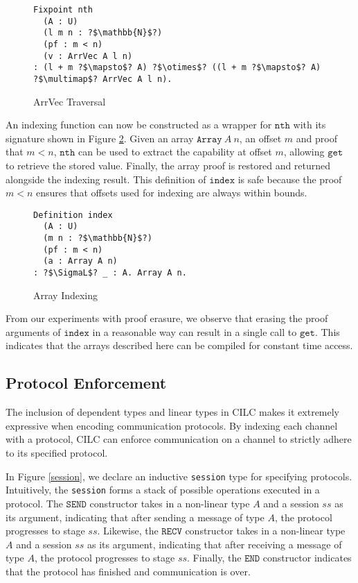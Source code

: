 \documentclass[sigplan,screen,review,anonymous]{acmart}
\newcommand{\get}{\texttt{get}}
\newcommand{\SEND}{\texttt{SEND}}
\newcommand{\RECV}{\texttt{RECV}}
\newcommand{\END}{\texttt{END}}
\newcommand{\SigmaL}{\Sigma_{\scriptscriptstyle L}}
\begin{document}
\begin{figure}[H]
  \caption{ArrVec Traversal}
  \begin{verbatim}
Fixpoint nth 
  (A : U) 
  (l m n : ?$\mathbb{N}$?) 
  (pf : m < n) 
  (v : ArrVec A l n) 
: (l + m ?$\mapsto$? A) ?$\otimes$? ((l + m ?$\mapsto$? A) ?$\multimap$? ArrVec A l n).
  \end{verbatim}
  \label{trav}
  \Description{}
\end{figure}

An indexing function can now be constructed as a wrapper for $\texttt{nth}$ with its signature shown in Figure \ref{index}. Given an array $\texttt{Array}\ A\ n$, an offset $m$ and proof that $m < n$, $\texttt{nth}$ can be used to extract the capability at offset $m$, allowing $\get$ to retrieve the stored value. Finally, the array proof is restored and returned alongside the indexing result. This definition of $\texttt{index}$ is safe because the proof $m < n$ ensures that offsets used for indexing are always within bounds.

\begin{figure}[h]
  \caption{Array Indexing}
  \begin{verbatim}
Definition index
  (A : U)
  (m n : ?$\mathbb{N}$?)
  (pf : m < n)
  (a : Array A n) 
: ?$\SigmaL$? _ : A. Array A n.
  \end{verbatim}
  \label{index}
  \Description{}
\end{figure}

From our experiments with proof erasure, we observe that erasing the proof arguments of $\texttt{index}$ in a reasonable way can result in a single call to $\get$. This indicates that the arrays described here can be compiled for constant time access.

\subsection{Protocol Enforcement}
The inclusion of dependent types and linear types in CILC makes it extremely expressive when encoding communication protocols. By indexing each channel with a protocol, CILC can enforce communication on a channel to strictly adhere to its specified protocol.

In Figure \ref{session}, we declare an inductive \texttt{session} type for specifying protocols. Intuitively, the \texttt{session}  forms a stack of possible operations executed in a protocol. The $\SEND$ constructor takes in a non-linear type $A$ and a session $ss$ as its argument, indicating that after sending a message of type $A$, the protocol progresses to stage $ss$. Likewise, the $\RECV$ constructor takes in a non-linear type $A$ and a session $ss$ as its argument, indicating that after receiving a message of type $A$, the protocol progresses to stage $ss$. Finally, the $\END$ constructor indicates that the protocol has finished and communication is over.
\end{document}
